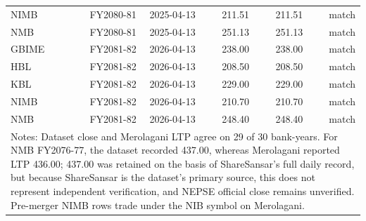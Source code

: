 \begin{table}[htbp]
\begin{tabular}{lrrrrr}
NIMB & FY2080-81 & 2025-04-13 & 211.51 & 211.51 & match \\
NMB & FY2080-81 & 2025-04-13 & 251.13 & 251.13 & match \\
GBIME & FY2081-82 & 2026-04-13 & 238.00 & 238.00 & match \\
HBL & FY2081-82 & 2026-04-13 & 208.50 & 208.50 & match \\
KBL & FY2081-82 & 2026-04-13 & 229.00 & 229.00 & match \\
NIMB & FY2081-82 & 2026-04-13 & 210.70 & 210.70 & match \\
NMB & FY2081-82 & 2026-04-13 & 248.40 & 248.40 & match \\
\midrule
\multicolumn{6}{l}{\footnotesize Notes: Dataset close and Merolagani LTP agree on 29 of 30 bank-years. For NMB FY2076-77, the dataset recorded 437.00, whereas Merolagani reported LTP 436.00; 437.00 was retained on the basis of ShareSansar's full daily record, but because ShareSansar is the dataset's primary source, this does not represent independent verification, and NEPSE official close remains unverified. Pre-merger NIMB rows trade under the NIB symbol on Merolagani.} \\
\bottomrule
\end{tabular}
\end{table}
